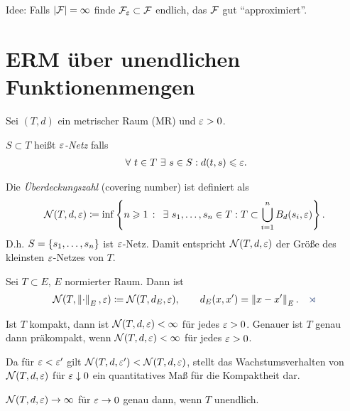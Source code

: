 Idee: Falls $\left|\mathcal{F}\right| = \infty$ finde $\mathcal{F}_\varepsilon \subset\mathcal{F}$ endlich, das $\mathcal{F}$
gut "`approximiert"'.

\section{ERM über unendlichen Funktionenmengen}
\label{sec:4.2}

\begin{defn}
\label{defn:4.2.1}
Sei $(T,d)$ ein metrischer Raum (MR) und $\varepsilon > 0$.
\begin{defnenum}
\item $S\subset T$ heißt \emph{$\varepsilon$-Netz} falls
\begin{align*}
\forall t\in T \exists s\in S : d(t,s) \le \ep.
\end{align*}
\item Die \emph{Überdeckungszahl} (covering number) ist
definiert als
\begin{align*}
\NN(T,d,\ep) \defl \inf\setdef{n\ge 1}{\exists s_1,\ldots,s_n\in T : T\subset
\bigcup_{i=1}^n B_d(s_i,\ep)}.
\end{align*}
D.h. $S=\left\{ s_1,\ldots,s_n \right\}$ ist $\varepsilon$-Netz. Damit entspricht $\mathcal{N}(T,d,\varepsilon)$
der Größe des kleinsten $\varepsilon$-Netzes von $T$.
\item Sei $T\subset E$, $E$ normierter Raum. Dann ist
\begin{align*}
\NN(T,\norm{\cdot}_E,\ep) \defl \NN(T,d_E,\ep),\qquad d_E(x,x') =
\norm{x-x'}_E.\fishhere
\end{align*}
\end{defnenum}
\end{defn}

\begin{bem*}[Interpretation.]
Ist $T$ kompakt, dann ist $\mathcal{N}(T,d,\varepsilon) < \infty$ für jedes $\varepsilon > 0$. Genauer
ist $T$ genau dann präkompakt, wenn $\mathcal{N}(T,d,\varepsilon) < \infty$ für jedes $\varepsilon > 0$.

Da für $\varepsilon < \varepsilon'$ gilt $\mathcal{N}(T,d,\varepsilon')<\mathcal{N}(T,d,\varepsilon)$, stellt das
Wachstumsverhalten von $\mathcal{N}(T,d,\varepsilon)$ für $\varepsilon \downarrow 0$ ein
quantitatives Maß für die Kompaktheit dar.

$\mathcal{N}(T,d,\varepsilon)\to \infty$ für $\varepsilon \to 0$ genau dann, wenn $T$ unendlich.\maphere
\end{bem*}

